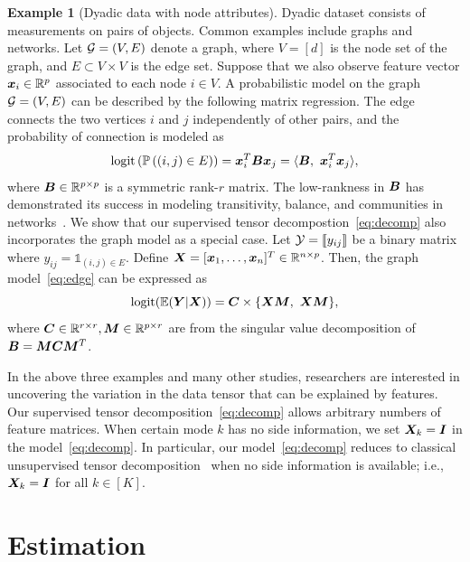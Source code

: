 \documentclass[12pt]{article}
\theoremstyle{definition}
\theoremstyle{definition}
\newtheorem{example}{Example}
\begin{document}
 \begin{example}[Dyadic data with node attributes] Dyadic dataset consists of measurements on pairs of objects. Common examples include graphs and networks. Let $\mathcal{G}=(V,E)$ denote a graph, where $V=[d]$ is the node set of the graph, and $E\subset V\times V$ is the edge set. Suppose that we also observe feature vector $\bm x_i\in\mathbb{R}^p$ associated to each node $i\in V$. A probabilistic model on the graph $\mathcal{G}=(V,E)$ can be described by the following matrix regression. The edge connects the two vertices $i$ and $j$ independently of other pairs, and the probability of connection is modeled as
\begin{equation}\label{eq:edge}
 \textup{logit}\left(\mathbb{P}\left((i,j)\in E\right)\right)=\mx^T_i\mB\mx_j=\langle \mB,\ \mx^T_i\mx_j\rangle,
 \end{equation}
 where $\bm B\in\mathbb{R}^{p\times p}$ is a symmetric rank-$r$ matrix. The low-rankness in $\bm B$ has demonstrated its success in modeling transitivity, balance, and communities in  networks~\citep{hoff2005bilinear}. We show that our supervised tensor decompostion~\eqref{eq:decomp} also incorporates the graph model as a special case. Let $\mathcal{Y}=\llbracket y_{ij} \rrbracket$ be a binary matrix where $y_{ij}=\mathds{1}_{(i,j)\in E}$. Define $\bm X=[\bm x_1,\ldots,\bm x_n]^T\in\mathbb{R}^{n\times p}$. Then, the graph model~\eqref{eq:edge} can be expressed as
 \[
 \textup{logit}(\mathbb{E}(\mY|\mX))=\mC\times\{\mX\mM,\ \mX\mM\}, 
  \]
  where $\bm C\in\mathbb{R}^{r\times r}, \bm M\in\mathbb{R}^{p\times r}$ are from the singular value decomposition of $\bm B=\bm M\bm C\bm M^T$. 
  \end{example}




In the above three examples and many other studies, researchers are interested in uncovering the variation in the data tensor that can be explained by features. Our supervised tensor decomposition~\eqref{eq:decomp} allows arbitrary numbers of feature matrices. When certain mode $k$ has no side information, we set $\bm X_k=\bm I$ in the model~\eqref{eq:decomp}. In particular, our model~\eqref{eq:decomp} reduces to classical unsupervised tensor decomposition~\citep{de2000multilinear,hong2020generalized} when no side information is available; i.e., $\bm X_k=\bm I$ for all $k\in[K]$.


\section{Estimation}\label{sec:est}
\end{document}
